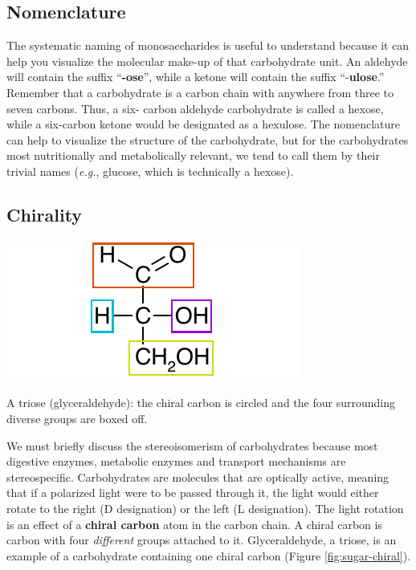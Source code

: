 \documentclass{tufte-handout}
\begin{document}
\subsection{Nomenclature}

The systematic naming of monosaccharides is useful to understand because it can help you visualize the molecular make-up of that carbohydrate unit. An aldehyde will contain the suffix ``\textbf{-ose}'', while a ketone will contain the suffix ``-\textbf{ulose}.'' Remember that a carbohydrate is a carbon chain with anywhere from three to seven carbons. Thus, a six- carbon aldehyde carbohydrate is called a hexose, while a six-carbon ketone would be designated as a hexulose. The nomenclature can help to visualize the structure of the carbohydrate, but for the carbohydrates most nutritionally and metabolically relevant, we tend to call them by their trivial names (\textit{e.g.}, glucose, which is technically a hexose).

\subsection{Chirality}

\begin{marginfigure}
\includegraphics{figures/sugar-chiral.pdf}
\caption{A triose (glyceraldehyde): the chiral carbon is circled and the four surrounding diverse groups are boxed off.}
\label{fig:sugar-chiral}
\end{marginfigure}

We must briefly discuss the stereoisomerism of carbohydrates because most digestive enzymes, metabolic enzymes and transport mechanisms are stereospecific. Carbohydrates are molecules that are optically active, meaning that if a polarized light were to be passed through it, the
light would either rotate to the right (D designation) or the left (L designation). The light rotation is an effect of a \textbf{chiral
carbon} atom in the carbon chain. A chiral carbon is carbon with four \emph{different} groups attached to it.  Glyceraldehyde, a triose, is an example of a carbohydrate containing one chiral carbon (Figure \ref{fig:sugar-chiral}).
\end{document}

